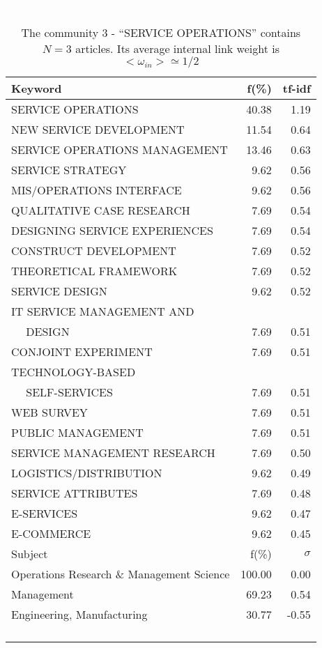 \documentclass[a4paper,11pt]{report}
\begin{document}
\begin{landscape}
\begin{table}[!ht]
\caption{The community 3 - ``SERVICE OPERATIONS'' contains $N = 3$ articles. Its average internal link weight is $<\omega_{in}> \simeq 1/2$ }
\textcolor{white}{aa}\\
{\scriptsize\begin{tabular}{|l r  r|}
\hline
Keyword & f(\%) & tf-idf \\
\hline
SERVICE OPERATIONS & 40.38 & 1.19\\
NEW SERVICE DEVELOPMENT & 11.54 & 0.64\\
SERVICE OPERATIONS MANAGEMENT & 13.46 & 0.63\\
SERVICE STRATEGY & 9.62 & 0.56\\
MIS/OPERATIONS INTERFACE & 9.62 & 0.56\\
QUALITATIVE CASE RESEARCH & 7.69 & 0.54\\
DESIGNING SERVICE EXPERIENCES & 7.69 & 0.54\\
CONSTRUCT DEVELOPMENT & 7.69 & 0.52\\
THEORETICAL FRAMEWORK & 7.69 & 0.52\\
SERVICE DESIGN & 9.62 & 0.52\\
IT SERVICE MANAGEMENT AND &  &\\
$\quad$ DESIGN & 7.69 & 0.51\\
CONJOINT EXPERIMENT & 7.69 & 0.51\\
TECHNOLOGY-BASED &  &\\
$\quad$ SELF-SERVICES & 7.69 & 0.51\\
WEB SURVEY & 7.69 & 0.51\\
PUBLIC MANAGEMENT & 7.69 & 0.51\\
SERVICE MANAGEMENT RESEARCH & 7.69 & 0.50\\
LOGISTICS/DISTRIBUTION & 9.62 & 0.49\\
SERVICE ATTRIBUTES & 7.69 & 0.48\\
E-SERVICES & 9.62 & 0.47\\
E-COMMERCE & 9.62 & 0.45\\
\hline
\hline
Subject & f(\%) & $\sigma$\\
\hline
Operations Research \& Management Science & 100.00 & 0.00\\
Management & 69.23 & 0.54\\
Engineering, Manufacturing & 30.77 & -0.55\\
 &  & \\
 &  & \\
 &  & \\
 &  & \\

\end{tabular}}
\end{table}
\end{landscape}
\end{document}
